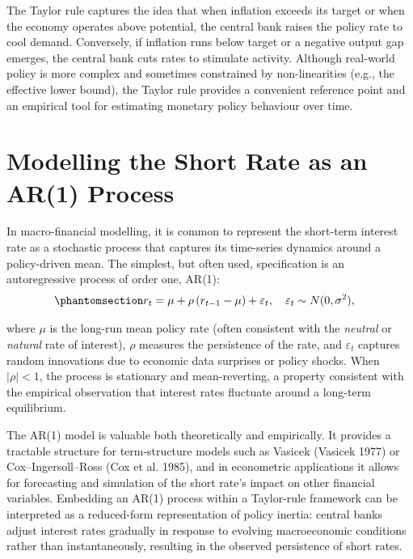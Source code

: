 \documentclass[
  letterpaper,
  DIV=11,
  numbers=noendperiod]{scrreprt}
\begin{document}
The Taylor rule captures the idea that when inflation exceeds its target
or when the economy operates above potential, the central bank raises
the policy rate to cool demand. Conversely, if inflation runs below
target or a negative output gap emerges, the central bank cuts rates to
stimulate activity. Although real-world policy is more complex and
sometimes constrained by non-linearities (e.g., the effective lower
bound), the Taylor rule provides a convenient reference point and an
empirical tool for estimating monetary policy behaviour over time.

\section{Modelling the Short Rate as an AR(1)
Process}\label{modelling-the-short-rate-as-an-ar1-process}

In macro-financial modelling, it is common to represent the short-term
interest rate as a stochastic process that captures its time-series
dynamics around a policy-driven mean. The simplest, but often used,
specification is an autoregressive process of order one, AR(1):
\begin{equation}\protect\phantomsection\label{eq-ar1}{
\begin{align}
    r_t &= \mu + \rho \, (r_{t-1} - \mu) + \varepsilon_t, \quad \varepsilon_t \sim N(0, \sigma^2),
\end{align}
}\end{equation}

where \(\mu\) is the long-run mean policy rate (often consistent with
the \emph{neutral} or \emph{natural} rate of interest), \(\rho\)
measures the persistence of the rate, and \(\varepsilon_t\) captures
random innovations due to economic data surprises or policy shocks. When
\(|\rho| < 1\), the process is stationary and mean-reverting, a property
consistent with the empirical observation that interest rates fluctuate
around a long-term equilibrium.

The AR(1) model is valuable both theoretically and empirically. It
provides a tractable structure for term-structure models such as Vasicek
(Vasicek 1977) or Cox--Ingersoll--Ross (Cox et al. 1985), and in
econometric applications it allows for forecasting and simulation of the
short rate's impact on other financial variables. Embedding an AR(1)
process within a Taylor-rule framework can be interpreted as a
reduced-form representation of policy inertia: central banks adjust
interest rates gradually in response to evolving macroeconomic
conditions rather than instantaneously, resulting in the observed
persistence of short rates.
\end{document}
